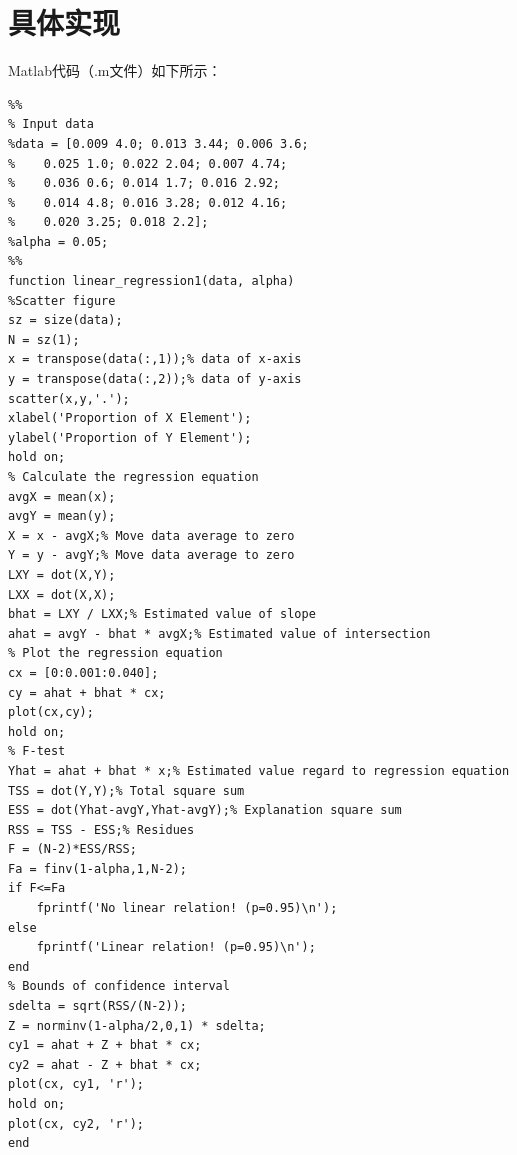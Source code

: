 \documentclass[UTF8]{ctexart}
\begin{document}
\section{具体实现}
Matlab代码（.m文件）如下所示：\par
\begin{lstlisting}
%%
% Input data
%data = [0.009 4.0; 0.013 3.44; 0.006 3.6; 
%    0.025 1.0; 0.022 2.04; 0.007 4.74; 
%    0.036 0.6; 0.014 1.7; 0.016 2.92; 
%    0.014 4.8; 0.016 3.28; 0.012 4.16; 
%    0.020 3.25; 0.018 2.2];
%alpha = 0.05;
%%
function linear_regression1(data, alpha)
%Scatter figure
sz = size(data);
N = sz(1);
x = transpose(data(:,1));% data of x-axis
y = transpose(data(:,2));% data of y-axis
scatter(x,y,'.');
xlabel('Proportion of X Element');
ylabel('Proportion of Y Element');
hold on;
% Calculate the regression equation
avgX = mean(x);
avgY = mean(y);
X = x - avgX;% Move data average to zero
Y = y - avgY;% Move data average to zero
LXY = dot(X,Y);
LXX = dot(X,X);
bhat = LXY / LXX;% Estimated value of slope
ahat = avgY - bhat * avgX;% Estimated value of intersection
% Plot the regression equation
cx = [0:0.001:0.040];
cy = ahat + bhat * cx;
plot(cx,cy);
hold on;
% F-test
Yhat = ahat + bhat * x;% Estimated value regard to regression equation
TSS = dot(Y,Y);% Total square sum
ESS = dot(Yhat-avgY,Yhat-avgY);% Explanation square sum
RSS = TSS - ESS;% Residues
F = (N-2)*ESS/RSS;
Fa = finv(1-alpha,1,N-2);
if F<=Fa
    fprintf('No linear relation! (p=0.95)\n');
else
    fprintf('Linear relation! (p=0.95)\n');
end
% Bounds of confidence interval
sdelta = sqrt(RSS/(N-2));
Z = norminv(1-alpha/2,0,1) * sdelta;
cy1 = ahat + Z + bhat * cx;
cy2 = ahat - Z + bhat * cx;
plot(cx, cy1, 'r');
hold on;
plot(cx, cy2, 'r');
end
\end{lstlisting}
\end{document}
